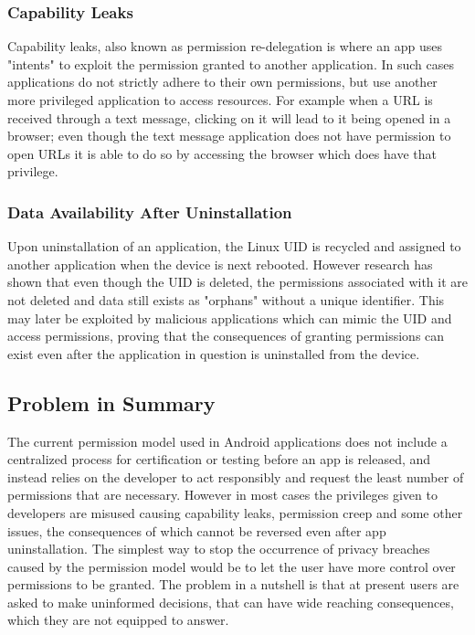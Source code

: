 \subsubsection{Capability Leaks}
Capability leaks, also known as permission re-delegation is where an app uses "intents" to exploit the permission granted to another application. In such cases applications do not strictly adhere to their own permissions, but use another more privileged application to access resources. For example when a URL is received through a text message, clicking on it will lead to it being opened in a browser; even though the text message application does not have permission to open URLs it is able to do so by accessing the browser which does have that privilege. 

\subsubsection{Data Availability After Uninstallation}
Upon uninstallation of an application, the Linux UID is recycled and assigned to another application when the device is next rebooted. However research has shown that even though the UID is deleted, the permissions associated with it are not deleted and data still exists as "orphans" without a unique identifier. This may later be exploited by malicious applications which can mimic the UID and access permissions, proving that the consequences of granting permissions can exist even after the application in question is uninstalled from the device. 

\subsection{Problem in Summary}
The current permission model used in Android applications does not include a centralized process for certification or testing before an app is released, and instead relies on the developer to act responsibly and request the least number of permissions that are necessary. However in most cases the privileges given to developers are misused causing capability leaks, permission creep and some other issues, the consequences of which cannot be reversed even after app uninstallation. The simplest way to stop the occurrence of privacy breaches caused by the permission model would be to let the user have more control over permissions to be granted. The problem in a nutshell is that at present users are asked to make uninformed decisions, that can have wide reaching consequences, which they are not equipped to answer.


